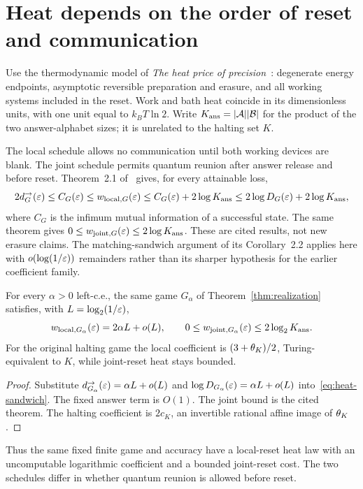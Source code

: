 \section{Heat depends on the order of reset and communication}\label{sec:heat}
Use the thermodynamic model of \emph{The heat price of precision}~\cite{DM-heat}: degenerate energy endpoints, asymptotic reversible preparation and erasure, and all working systems included in the reset. Work and bath heat coincide in its dimensionless units, with one unit equal to $k_BT\ln2$. Write $K_{\rm ans}=|\mathcal A||\mathcal B|$ for the product of the two answer-alphabet sizes; it is unrelated to the halting set $K$.

The local schedule allows no communication until both working devices are blank. The joint schedule permits quantum reunion after answer release and before reset. Theorem~2.1 of~\cite{DM-heat} gives, for every attainable loss,
\begin{equation}\label{eq:heat-sandwich}
 2d^\to_G(\varepsilon)\le C_G(\varepsilon)\le w_{{\rm local},G}(\varepsilon)
 \le C_G(\varepsilon)+2\log K_{\rm ans}
 \le2\log D_G(\varepsilon)+2\log K_{\rm ans},
\end{equation}
where $C_G$ is the infimum mutual information of a successful state. The same theorem gives $0\le w_{{\rm joint},G}(\varepsilon)\le2\log K_{\rm ans}$. These are cited results, not new erasure claims. The matching-sandwich argument of its Corollary~2.2 applies here with $o(\log(1/\varepsilon))$ remainders rather than its sharper hypothesis for the earlier coefficient family.

\begin{corollary}\label{cor:heat}
For every $\alpha>0$ left-c.e., the same game $G_\alpha$ of Theorem~\ref{thm:realization} satisfies, with $L=\log_2(1/\varepsilon)$,
\begin{equation}\label{eq:heat-law}
 w_{{\rm local},G_\alpha}(\varepsilon)=2\alpha L+o(L),\qquad
 0\le w_{{\rm joint},G_\alpha}(\varepsilon)\le2\log_2K_{\rm ans}.
\end{equation}
For the original halting game the local coefficient is $(3+\theta_K)/2$, Turing-equivalent to $K$, while joint-reset heat stays bounded.
\end{corollary}
\begin{proof}
Substitute $d^\to_{G_\alpha}(\varepsilon)=\alpha L+o(L)$ and $\log D_{G_\alpha}(\varepsilon)=\alpha L+o(L)$ into~\eqref{eq:heat-sandwich}. The fixed answer term is $O(1)$. The joint bound is the cited theorem. The halting coefficient is $2c_K$, an invertible rational affine image of $\theta_K$.
\end{proof}

Thus the same fixed finite game and accuracy have a local-reset heat law with an uncomputable logarithmic coefficient and a bounded joint-reset cost. The two schedules differ in whether quantum reunion is allowed before reset.
